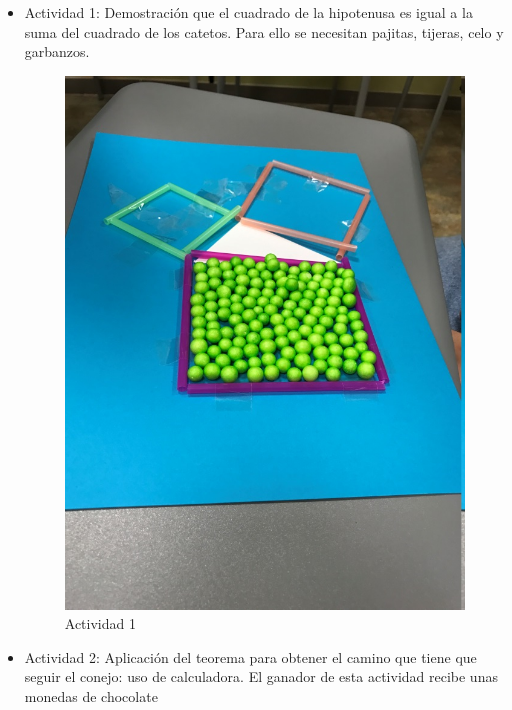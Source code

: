 \begin{itemize}

\item Actividad 1: Demostración que el cuadrado de la hipotenusa es igual a la suma del cuadrado de los catetos. Para ello se necesitan pajitas, tijeras, celo y garbanzos. 

\begin{figure}[hbtp]
\centering
\includegraphics{img/grupo5_1.jpg}
\caption{Actividad 1}
\end{figure}



\item Actividad 2: Aplicación del teorema para obtener el camino que tiene que seguir el conejo: uso de calculadora. El ganador de esta actividad recibe unas monedas de chocolate


\end{itemize}
